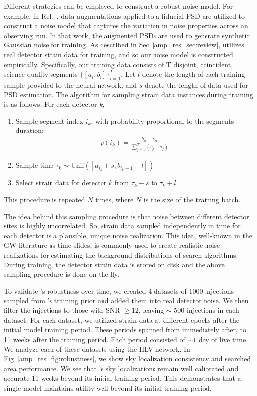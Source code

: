 \begin{refsection}
Different strategies can be employed to construct a robust noise model. 
For example, in Ref.~\cite{Wildberger_2023}, data augmentations applied to a fiducial PSD are utilized to construct a noise model that captures the variation in noise properties across an observing run. 
In that work, the augmented PSDs are used to generate synthetic Gaussian noise for training. 
As described in Sec~\ref{amp_res_sec:review}, \amplfi utilizes real detector strain data for training, and so our noise model is constructed empirically. 
Specifically, our training data consists of T disjoint, coincident, science quality segments $\{[a_i, b_i]\}_{i=1}^{T}$. 
Let $l$ denote the length of each training sample provided to the neural network, and $s$ denote the length of data used for PSD estimation. 
The algorithm for sampling strain data instances during training is as follows. 
For each detector $k$,
\begin{enumerate}
    \item Sample segment index $i_k$, with probability proportional to the segments duration:
    \begin{align*}
       p(i_k) = \frac{b_{i_k} - a_{i_k}}{\sum_{j=1}^T{(b_j - a_j)}}
    \end{align*}
    
    \item Sample time $\tau_k \sim \mathrm{Unif}([a_{i_k} + s,b_{i_k + 1} - l])$
    \item Select strain data for detector $k$ from $\tau_k - s$ to $\tau_k + l$ 
\end{enumerate}
This procedure is repeated $N$ times, where $N$ is the size of the training batch. 

The idea behind this sampling procedure is that noise between different detector sites is highly uncorrelated. 
So, strain data sampled independently in time for each detector is a plausible, unique noise realization. 
This idea, well-known in the GW literature as time-slides, is commonly used to create realistic noise realizations for estimating the background distributions of search algorithms. 
During training, the detector strain data is stored on disk and the above sampling procedure is done on-the-fly.

To validate \amplfi's robustness over time, we created 4 datasets of 1000 injections sampled from \amplfi's training prior and added them into real detector noise. 
We then filter the injections to those with SNR $\geq 12$, leaving $\sim$ 500 injections in each dataset.
For each dataset, we utilized strain data at different epochs after the initial model training period. 
These periods spanned from immediately after, to 11 weeks after the training period. 
Each period consisted of $\sim 1$ day of live time. 
We analyze each of these datasets using the HLV \amplfi network. 
In Fig~\ref{amp_res_fig:robustness}, we show sky localization consistency and searched area performance. 
We see that \amplfi's sky localizations remain well calibrated and accurate 11 weeks beyond its initial training period. 
This demonstrates that a single \amplfi model maintains utility well beyond its initial training period. 


\end{refsection}
